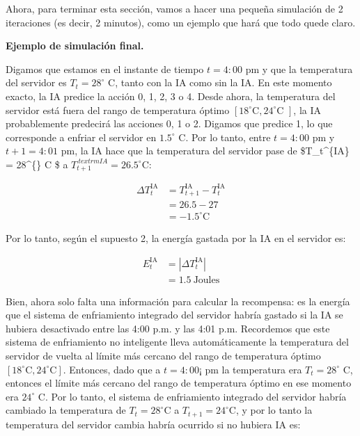 \documentclass[]{book}
\begin{document}
Ahora, para terminar esta sección, vamos a hacer una pequeña simulación de 2 iteraciones (es decir, 2 minutos), como un ejemplo que hará que todo quede claro.

\textbf{Ejemplo de simulación final.}

Digamos que estamos en el instante de tiempo \(t = 4:00\) pm y que la temperatura del servidor es \(T_t = 28^{\circ}\) C, tanto con la IA como sin la IA. En este momento exacto, la IA predice la acción 0, 1, 2, 3 o 4. Desde ahora, la temperatura del servidor está fuera del rango de temperatura óptimo \([18^{\circ} \textrm{C}, 24^{\circ} \textrm{C }]\), la IA probablemente predecirá las acciones 0, 1 o 2. Digamos que predice 1, lo que corresponde a enfriar el servidor en \(1.5^{\circ}\) C. Por lo tanto, entre \(t = 4:00\) pm y \(t + 1 = 4: 01\) pm, la IA hace que la temperatura del servidor pase de \$T\_t\^{}\{\textrm{IA}\} = 28\^{}\{\circ\} \textrm{C} \$ a \(T_{t + 1}^{\ textrm{IA}} = 26.5^{\circ} \textrm{C}\):

\begin{align*}
    \Delta T_t^{\textrm{IA}}
    & = T_{t+1}^{\textrm{IA}} - T_t^{\textrm{IA}} \\
    & = 26.5 - 27 \\
    & = -1.5^{\circ} \textrm{C}
\end{align*}

Por lo tanto, según el supuesto 2, la energía gastada por la IA en el servidor es:

\begin{align*}
    E_t^{\textrm{IA}}
    & = |\Delta T_t^{\textrm{IA}}| \\
    & = 1.5 \ \textrm{Joules}
\end{align*}

Bien, ahora solo falta una información para calcular la recompensa: es la energía que el sistema de enfriamiento integrado del servidor habría gastado si la IA se hubiera desactivado entre las 4:00 p.m. y las 4:01 p.m. Recordemos que este sistema de enfriamiento no inteligente lleva automáticamente la temperatura del servidor de vuelta al límite más cercano del rango de temperatura óptimo \([18^{\circ} \textrm{C}, 24^{\circ} \textrm{C}]\). Entonces, dado que a \(t = 4: 00 ¡\) pm la temperatura era \(T_t = 28^{\circ}\) C, entonces el límite más cercano del rango de temperatura óptimo en ese momento era \(24^{\circ}\) C. Por lo tanto, el sistema de enfriamiento integrado del servidor habría cambiado la temperatura de \(T_t = 28^{\circ} \textrm{C}\) a \(T_{t + 1} = 24^{\circ} \textrm{C}\), y por lo tanto la temperatura del servidor cambia habría ocurrido si no hubiera IA es:
\end{document}
